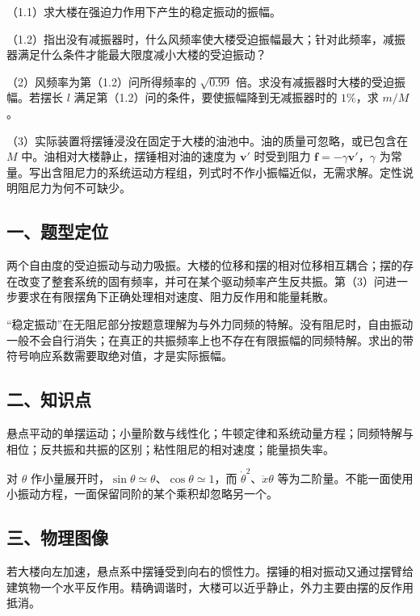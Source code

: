 \documentclass[12pt,a4paper,fontset=fandol]{ctexart}
\begin{document}
（1.1）求大楼在强迫力作用下产生的稳定振动的振幅。

（1.2）指出没有减振器时，什么风频率使大楼受迫振幅最大；针对此频率，减振器满足什么条件才能最大限度减小大楼的受迫振动？

（2）风频率为第（1.2）问所得频率的 \(\sqrt{0.99}\)
倍。求没有减振器时大楼的受迫振幅。若摆长 \(l\)
满足第（1.2）问的条件，要使振幅降到无减振器时的 \(1\%\)，求 \(m/M\)。

（3）实际装置将摆锤浸没在固定于大楼的油池中。油的质量可忽略，或已包含在
\(M\) 中。油相对大楼静止，摆锤相对油的速度为 \(\boldsymbol v'\)
时受到阻力 \(\boldsymbol f=-\gamma\boldsymbol v'\)，\(\gamma\)
为常量。写出含阻尼力的系统运动方程组，列式时不作小振幅近似，无需求解。定性说明阻尼力为何不可缺少。

\subsection{一、题型定位}\label{ux4e00ux9898ux578bux5b9aux4f4d}

两个自由度的受迫振动与动力吸振。大楼的位移和摆的相对位移相互耦合；摆的存在改变了整套系统的固有频率，并可在某个驱动频率产生反共振。第（3）问进一步要求在有限摆角下正确处理相对速度、阻力反作用和能量耗散。

``稳定振动''在无阻尼部分按题意理解为与外力同频的特解。没有阻尼时，自由振动一般不会自行消失；在真正的共振频率上也不存在有限振幅的同频特解。求出的带符号响应系数需要取绝对值，才是实际振幅。

\subsection{二、知识点}\label{ux4e8cux77e5ux8bc6ux70b9}

悬点平动的单摆运动；小量阶数与线性化；牛顿定律和系统动量方程；同频特解与相位；反共振和共振的区别；粘性阻尼的相对速度；能量损失率。

对 \(\theta\)
作小量展开时，\(\sin\theta\simeq\theta\)、\(\cos\theta\simeq1\)，而
\(\dot\theta^2\)、\(\ddot x\theta\)
等为二阶量。不能一面使用小振动方程，一面保留同阶的某个乘积却忽略另一个。

\subsection{三、物理图像}\label{ux4e09ux7269ux7406ux56feux50cf}

若大楼向左加速，悬点系中摆锤受到向右的惯性力。摆锤的相对振动又通过摆臂给建筑物一个水平反作用。精确调谐时，大楼可以近乎静止，外力主要由摆的反作用抵消。
\end{document}
